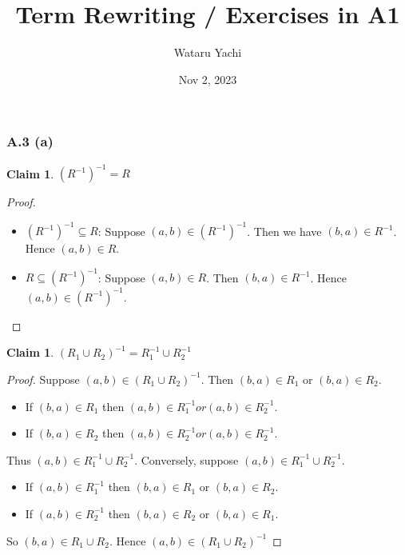 \documentclass[12pt,aspectratio=169]{beamer}
\title{ Term Rewriting / Exercises in A1 }
\author{Wataru Yachi}
\institute{JAIST}
\date{Nov 2, 2023}
\theoremstyle{claim}
\newtheorem{claim}[theorem]{Claim}%
\begin{document}
\maketitle
\newcommand{\R}[3]{#1 \; #2 \; #3}

\begin{frame}
    \frametitle{A.3 (a)}
    \begin{claim}
      $(R^{-1})^{-1} = R$
    \end{claim}
    \begin{proof}
      \begin{itemize}
      \item $(R^{-1})^{-1} \subseteq R$:
      Suppose $(a,b) \in (R^{-1})^{-1}$.
      Then we have $(b,a) \in R^{-1}$.
      Hence $(a,b) \in R$.
  \item $R \subseteq (R^{-1})^{-1}$: Suppose $(a,b) \in R$.
      Then $(b,a) \in R^{-1}$. Hence $(a,b) \in (R^{-1})^{-1}$.
      \end{itemize}
    \end{proof}
\end{frame}

\begin{frame}
    \begin{claim}
        $(R_1 \cup R_2)^{-1} = R_1^{-1} \cup R_2^{-1}$
    \end{claim}
    \begin{proof}
        Suppose $(a,b) \in (R_1 \cup R_2)^{-1}$.
        Then $(b,a) \in R_1$ or $(b,a) \in R_2$.
        \begin{itemize}
          \item If $(b,a) \in R_1$ then $(a,b) \in R_1^{-1} or (a,b) \in R_2^{-1}$.
          \item If $(b,a) \in R_2$ then $(a,b) \in R_2^{-1} or (a,b) \in R_2^{-1}$.
        \end{itemize}
        Thus $(a,b) \in R_1^{-1} \cup R_2^{-1}$.
        Conversely, suppose $(a,b) \in R_1^{-1} \cup R_2^{-1}$.
        \begin{itemize}
          \item If $(a,b) \in R_1^{-1}$ then $(b,a) \in R_1$ or $(b,a) \in R_2$.
          \item If $(a,b) \in R_2^{-1}$ then $(b,a) \in R_2$ or $(b,a) \in R_1$.
        \end{itemize}
        So $(b,a) \in R_1 \cup R_2$. Hence $(a,b) \in (R_1 \cup R_2)^{-1}$
    \end{proof}
\end{frame}
\end{document}
